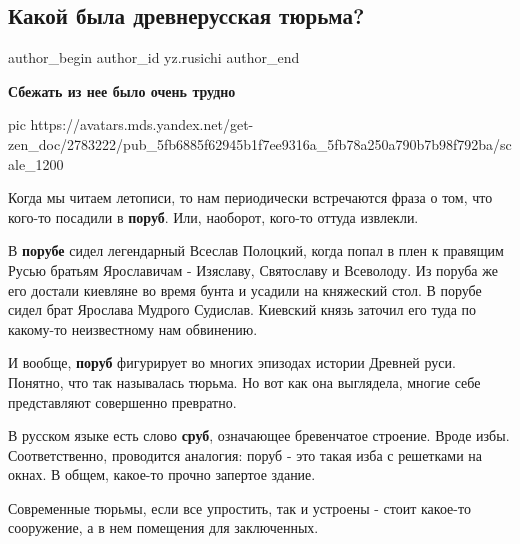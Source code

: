  
 
 
 
 
 
\subsection{Какой была древнерусская тюрьма?}
\label{sec:24_11_2020.sites.ru.zen_yandex.yz.rusichi.1.drevnerusskaja_turma}
\ifcmt
	author_begin
   author_id yz.rusichi
	author_end
\fi

{\bfseries 
Сбежать из нее было очень трудно
}


\ifcmt
  pic https://avatars.mds.yandex.net/get-zen_doc/2783222/pub_5fb6885f62945b1f7ee9316a_5fb78a250a790b7b98f792ba/scale_1200
\fi

Когда мы читаем летописи, то нам периодически встречаются фраза о том, что
кого-то посадили в \textbf{поруб}. Или, наоборот, кого-то оттуда извлекли.

В \textbf{порубе} сидел легендарный Всеслав Полоцкий, когда попал в плен к правящим
Русью братьям Ярославичам - Изяславу, Святославу и Всеволоду. Из поруба же его
достали киевляне во время бунта и усадили на княжеский стол. В порубе сидел
брат Ярослава Мудрого Судислав. Киевский князь заточил его туда по какому-то
неизвестному нам обвинению.

И вообще, \textbf{поруб} фигурирует во многих эпизодах истории Древней руси. Понятно,
что так называлась тюрьма. Но вот как она выглядела, многие себе представляют
совершенно превратно.

В русском языке есть слово \textbf{сруб}, означающее бревенчатое строение. Вроде избы.
Соответственно, проводится аналогия: поруб - это такая изба с решетками на
окнах. В общем, какое-то прочно запертое здание.

Современные тюрьмы, если все упростить, так и устроены - стоит какое-то
сооружение, а в нем помещения для заключенных.

